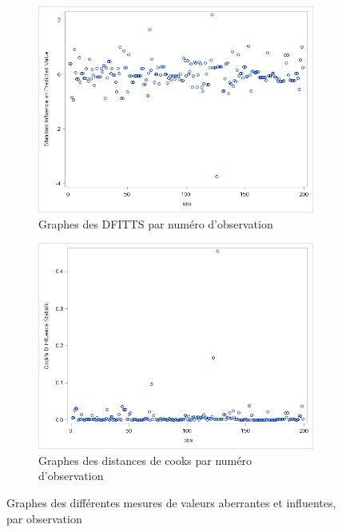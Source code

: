 \documentclass[11pt,a4paper]{article}
\begin{document}
\begin{figure}[h]
\begin{subfigure}{0.5\textwidth}
		\label{fig:stud}
	\end{subfigure}
	\begin{subfigure}{0.5\textwidth}
		\includegraphics[width=1\linewidth]{dfits}
		\caption{Graphes des DFITTS par numéro d'observation}
		\label{fig:dfits}
	\end{subfigure}
	\begin{subfigure}{0.5\textwidth}
		\includegraphics[width=1\linewidth]{cookd}
		\caption{Graphes des distances de cooks par numéro d'observation}
		\label{fig:cookd}
	\end{subfigure}
	\caption{Graphes des différentes mesures de valeurs aberrantes et influentes, par observation}
\end{figure}
\end{document}
